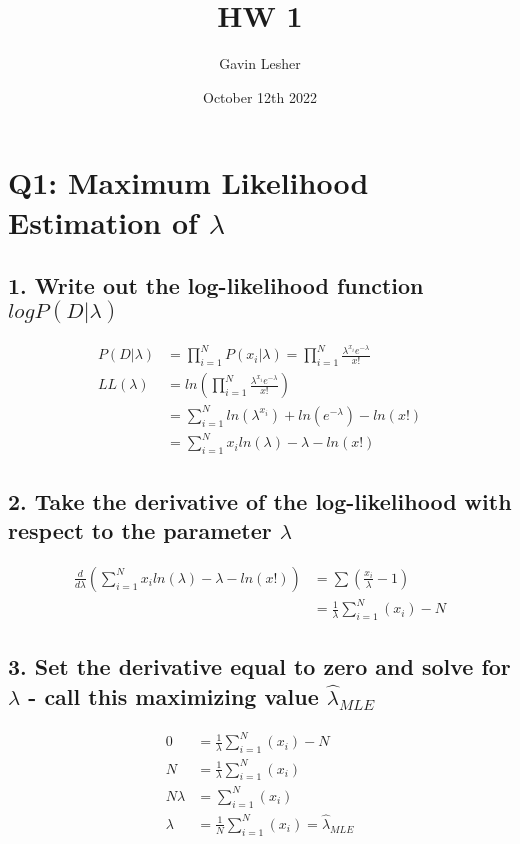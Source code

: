 \documentclass{article}
\title{HW 1}
\author{Gavin Lesher}
\date{October 12th 2022}
\begin{document}
    \maketitle
    \section*{Q1: Maximum Likelihood Estimation of $\lambda$}
        \subsection*{1. Write out the log-likelihood function $logP(D|\lambda)$}

            \begin{align*}
                P(D|\lambda) &= \prod^{N}_{i=1} P(x_i | \lambda) = \prod_{i=1}^{N} \frac{\lambda^{x_i}e^{-\lambda}}{x!}\\
                LL(\lambda)&= ln(\prod_{i=1}^{N} \frac{\lambda^{x_i}e^{-\lambda}}{x!})\\
                &= \sum_{i=1}^{N} ln(\lambda^{x_i}) + ln(e^{-\lambda}) - ln(x!)\\
                &= \sum_{i=1}^{N} x_iln(\lambda) - \lambda - ln(x!)
            \end{align*}

        \subsection*{2. Take the derivative of the log-likelihood with respect to the parameter $\lambda$}
            \begin{align*}
                \frac{d}{d\lambda}\left(\sum_{i=1}^{N} x_iln(\lambda) - \lambda - ln(x!)\right) &= \sum(\frac{x_i}{\lambda} -1) \\
                &= \frac{1}{\lambda}\sum_{i=1}^N (x_i) -N
            \end{align*}

        \subsection*{3. Set the derivative equal to zero and solve for $\lambda$ - call this maximizing value $\hat{\lambda}_{MLE}$}
    
            \begin{align*}
                0 &= \frac{1}{\lambda}\sum_{i=1}^N (x_i) -N\\
                N &= \frac{1}{\lambda}\sum_{i=1}^N (x_i)\\
                N\lambda &= \sum_{i=1}^N (x_i)\\
                \lambda &= \frac{1}{N}\sum_{i=1}^N (x_i) = \hat{\lambda}_{MLE}
            \end{align*}
\end{document}
